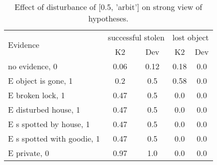 \begin{table}\begin{tabular}{l|cc|cc}\toprule\multirow{2}{*}{Evidence} & \multicolumn{2}{c}{successful stolen}& \multicolumn{2}{c}{lost object}\\& {K2} & {Dev}& {K2} & {Dev}\\\midrule
no evidence, 0 & \cellcolor{Bittersweet}0.06&\cellcolor{Bittersweet}0.12&\cellcolor{Bittersweet}0.18&\cellcolor{Bittersweet}0.0\\E object is gone, 1 & \cellcolor{Bittersweet}0.2&\cellcolor{Bittersweet}0.5&\cellcolor{Bittersweet}0.58&\cellcolor{Bittersweet}0.0\\E broken lock, 1 & 0.47&0.5&0.0&0.0\\E disturbed house, 1 & 0.47&0.5&0.0&0.0\\E s spotted by house, 1 & 0.47&0.5&0.0&0.0\\E s spotted with goodie, 1 & 0.47&0.5&0.0&0.0\\E private, 0 & 0.97&1.0&0.0&0.0\\\bottomrule\end{tabular}\caption{Effect of disturbance of [0.5, 'arbit'] on strong view of hypotheses.}\end{table}